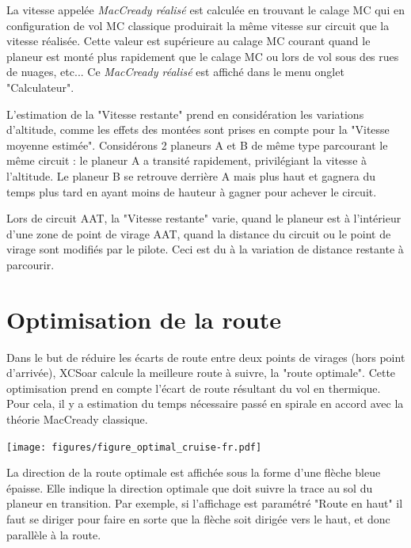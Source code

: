 La vitesse appelée  {\em MacCready réalisé} est calculée en trouvant le calage MC qui en configuration de vol MC classique produirait la même vitesse sur circuit que la vitesse réalisée. Cette valeur est supérieure au calage MC courant quand le planeur est monté plus rapidement que le calage MC ou lors de vol sous des rues de nuages, etc... Ce {\em MacCready réalisé} est affiché dans le menu \blink{} onglet "Calculateur".

L'estimation de la "Vitesse restante" prend en considération les variations d'altitude, comme les effets des montées sont prises en compte pour la "Vitesse moyenne estimée". Considérons 2 planeurs A et B de même type parcourant le même circuit : le planeur A a transité rapidement, privilégiant la vitesse à l'altitude. Le planeur B se retrouve derrière A mais plus haut et gagnera du temps plus tard en ayant moins de hauteur à gagner pour achever le circuit.

Lors de circuit AAT, la "Vitesse restante" varie, quand le planeur est à l'intérieur d'une zone de point de virage AAT, quand la distance du circuit ou le point de virage sont modifiés par le pilote. Ceci est du à la variation de distance restante à parcourir.


\section{Optimisation de la route}
Dans le but de réduire les écarts de route entre deux points de virages (hors point d'arrivée), XCSoar calcule la meilleure route à suivre, la "route optimale". Cette optimisation prend en compte l'écart de route résultant du vol en thermique. Pour cela, il y a estimation du temps nécessaire passé en spirale en accord avec la théorie MacCready classique.

\begin{center}
\begin{maxipage}
\centering
\def\svgwidth{0.8\linewidth}
\texttt{[image: figures/figure\_optimal\_cruise-fr.pdf]}
\end{maxipage}
\end{center}

La direction de la route optimale est affichée sous la forme d'une flèche bleue épaisse. Elle indique la direction optimale que doit suivre la trace au sol du planeur en transition. Par exemple, si l'affichage est paramétré "Route en haut" il faut se diriger pour faire en sorte que la flèche soit dirigée vers le haut, et donc parallèle à la route.

